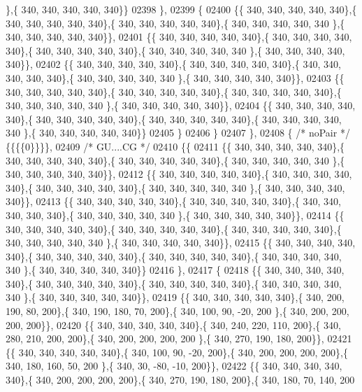 \begin{DoxyCode}
      \},\{ 340, 340, 340, 340, 340\}\}
02398 \},
02399 \{
02400 \{\{ 340, 340, 340, 340, 340\},\{ 340, 340, 340, 340, 340\},\{ 340, 340, 340, 340, 340\},\{ 340, 340, 340, 340, 340
      \},\{ 340, 340, 340, 340, 340\}\},
02401 \{\{ 340, 340, 340, 340, 340\},\{ 340, 340, 340, 340, 340\},\{ 340, 340, 340, 340, 340\},\{ 340, 340, 340, 340, 340
      \},\{ 340, 340, 340, 340, 340\}\},
02402 \{\{ 340, 340, 340, 340, 340\},\{ 340, 340, 340, 340, 340\},\{ 340, 340, 340, 340, 340\},\{ 340, 340, 340, 340, 340
      \},\{ 340, 340, 340, 340, 340\}\},
02403 \{\{ 340, 340, 340, 340, 340\},\{ 340, 340, 340, 340, 340\},\{ 340, 340, 340, 340, 340\},\{ 340, 340, 340, 340, 340
      \},\{ 340, 340, 340, 340, 340\}\},
02404 \{\{ 340, 340, 340, 340, 340\},\{ 340, 340, 340, 340, 340\},\{ 340, 340, 340, 340, 340\},\{ 340, 340, 340, 340, 340
      \},\{ 340, 340, 340, 340, 340\}\}
02405 \}
02406 \}
02407 \},
02408 \{ \textcolor{comment}{/* noPair */} \{\{\{\{0\}\}\}\},
02409 \textcolor{comment}{/* GU....CG */}
02410 \{\{
02411 \{\{ 340, 340, 340, 340, 340\},\{ 340, 340, 340, 340, 340\},\{ 340, 340, 340, 340, 340\},\{ 340, 340, 340, 340, 340
      \},\{ 340, 340, 340, 340, 340\}\},
02412 \{\{ 340, 340, 340, 340, 340\},\{ 340, 340, 340, 340, 340\},\{ 340, 340, 340, 340, 340\},\{ 340, 340, 340, 340, 340
      \},\{ 340, 340, 340, 340, 340\}\},
02413 \{\{ 340, 340, 340, 340, 340\},\{ 340, 340, 340, 340, 340\},\{ 340, 340, 340, 340, 340\},\{ 340, 340, 340, 340, 340
      \},\{ 340, 340, 340, 340, 340\}\},
02414 \{\{ 340, 340, 340, 340, 340\},\{ 340, 340, 340, 340, 340\},\{ 340, 340, 340, 340, 340\},\{ 340, 340, 340, 340, 340
      \},\{ 340, 340, 340, 340, 340\}\},
02415 \{\{ 340, 340, 340, 340, 340\},\{ 340, 340, 340, 340, 340\},\{ 340, 340, 340, 340, 340\},\{ 340, 340, 340, 340, 340
      \},\{ 340, 340, 340, 340, 340\}\}
02416 \},
02417 \{
02418 \{\{ 340, 340, 340, 340, 340\},\{ 340, 340, 340, 340, 340\},\{ 340, 340, 340, 340, 340\},\{ 340, 340, 340, 340, 340
      \},\{ 340, 340, 340, 340, 340\}\},
02419 \{\{ 340, 340, 340, 340, 340\},\{ 340, 200, 190,  80, 200\},\{ 340, 190, 180,  70, 200\},\{ 340, 100,  90, -20, 200
      \},\{ 340, 200, 200, 200, 200\}\},
02420 \{\{ 340, 340, 340, 340, 340\},\{ 340, 240, 220, 110, 200\},\{ 340, 280, 210, 200, 200\},\{ 340, 200, 200, 200, 200
      \},\{ 340, 270, 190, 180, 200\}\},
02421 \{\{ 340, 340, 340, 340, 340\},\{ 340, 100,  90, -20, 200\},\{ 340, 200, 200, 200, 200\},\{ 340, 180, 160,  50, 200
      \},\{ 340,  30, -80, -10, 200\}\},
02422 \{\{ 340, 340, 340, 340, 340\},\{ 340, 200, 200, 200, 200\},\{ 340, 270, 190, 180, 200\},\{ 340, 180,  70, 140, 200

\end{DoxyCode}
